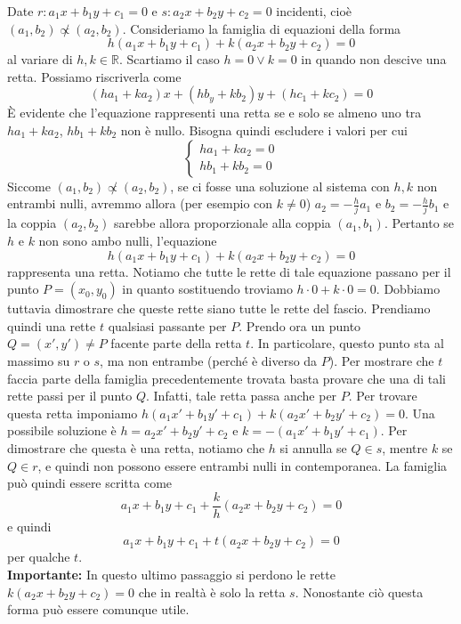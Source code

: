 \documentclass[a4paper]{article}
\begin{document}
Date \(r\colon a_1x + b_1y + c_1 = 0\) e \(s\colon a_2x + b_2y + c_2 = 0\)
incidenti, cioè \((a_1, b_2) \not\propto (a_2, b_2)\).
Consideriamo la famiglia di equazioni della forma
\[ h(a_1x + b_1y + c_1) + k(a_2x + b_2y + c_2) = 0 \]
al variare di \(h,k \in \mathbb{R}\).
Scartiamo il caso \(h=0\lor k=0\) in quando non descive una retta.
Possiamo riscriverla come 
\[ (ha_1 + ka_2)x + (hb_y + kb_2)y + (hc_1 + kc_2) = 0 \]
È evidente che l'equazione rappresenti una retta se e solo se
almeno uno tra \(ha_1 + ka_2\), \(hb_1 + kb_2\) non è nullo.
Bisogna quindi escludere i valori per cui
\[
    \begin{cases}
        ha_1 + ka_2 = 0 \\
        hb_1 + kb_2 = 0
    \end{cases}
\]
Siccome \((a_1,b_2) \not\propto (a_2, b_2)\), se ci fosse una soluzione al sistema
con \(h,k\) non entrambi nulli, avremmo allora (per esempio con \(k\neq 0\))
\(a_2 = -\frac{h}{j}a_1\) e \(b_2 = -\frac{h}{j}b_1\) e la coppia
\((a_2,b_2)\) sarebbe allora proporzionale alla coppia \((a_1, b_1)\).
Pertanto se \(h\) e \(k\) non sono ambo nulli, l'equazione
\[ h(a_1x + b_1y + c_1) + k(a_2x + b_2y + c_2) = 0 \]
rappresenta una retta.
Notiamo che tutte le rette di tale equazione passano per il punto \(P=(x_0, y_0)\)
in quanto sostituendo troviamo \(h\cdot 0 + k\cdot 0 = 0\).
Dobbiamo tuttavia dimostrare che queste rette siano tutte le rette del fascio.
Prendiamo quindi una rette \(t\) qualsiasi passante per \(P\).
Prendo ora un punto \(Q=(x', y') \neq P\) facente parte della retta \(t\).
In particolare, questo punto sta al massimo su \(r\) o \(s\), ma non entrambe (perché è diverso da \(P\)).
Per mostrare che \(t\) faccia parte della famiglia precedentemente trovata basta provare che
una di tali rette passi per il punto \(Q\). Infatti, tale retta passa
anche per \(P\).
Per trovare questa retta imponiamo \(h(a_1x' + b_1y' + c_1) + k(a_2x' + b_2y' + c_2) = 0\).
Una possibile soluzione è \(h = a_2x' + b_2y' + c_2\) e \(k = -(a_1x' + b_1y' + c_1)\).
Per dimostrare che questa è una retta, notiamo che \(h\) si annulla se \(Q \in s\),
mentre \(k\) se \(Q \in r\), e quindi non possono essere entrambi nulli in contemporanea.
La famiglia può quindi essere scritta come
\[
    a_1x + b_1y + c_1 + \frac{k}{h}(a_2x + b_2y + c_2) = 0
\]
e quindi
\[
    a_1x + b_1y + c_1 + t(a_2x + b_2y + c_2) = 0
\]
per qualche \(t\). \\
{\color{red}\textbf{Importante:}} In questo ultimo passaggio si perdono le rette \(k(a_2x + b_2y + c_2) = 0\)
che in realtà è solo la retta \(s\). Nonostante ciò questa forma può essere comunque utile.
\end{document}
